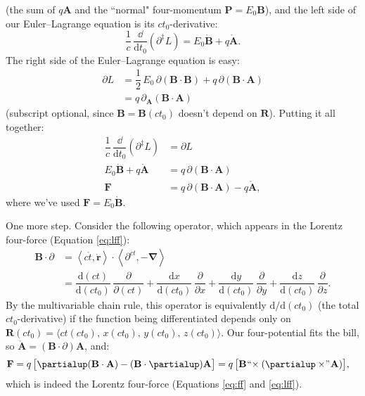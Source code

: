 \documentclass[12pt]{article}
\renewcommand{\vv}[1]{\mathbf{#1}}
\newcommand{\dd}[1]{\mathrm{d}#1}
\newcommand{\del}{\boldsymbol{\nabla}}
\begin{document}
(the sum of $q \vv A$ and the ``normal" four-momentum $\vv P = E_0 \vv B$), and the left side of our Euler--Lagrange equation is its $ct_0$-derivative:
\begin{equation*}
\dfrac{1}{c} \, \dfrac{\dd}{\dd t_0} \left( \partialup^\ddagger L \right) =  E_0 \mathring{\vv B} + q \mathring{\vv A} .
\end{equation*}
The right side of the Euler--Lagrange equation is easy:
\begin{equation*}
\begin{split}
\partialup L &= \dfrac{1}{2} \, E_0 \, \partialup (\vv B \cdot \vv B) + q \, \partialup (\vv B \cdot \vv A) \\[2pt]
&= q \, \partialup_{\vv A} (\vv B \cdot \vv A)
\end{split}
\end{equation*}
(subscript optional, since $\vv B = \vv B(ct_0)$ doesn't depend on $\vv R$). Putting it all together:
\begin{equation*}
\begin{split}
\dfrac{1}{c} \, \dfrac{\dd}{\dd t_0} \left( \partialup^\ddagger L \right) &= \partialup L \\[2pt]
E_0 \mathring{\vv B} + q \mathring{\vv A} &= q \, \partialup (\vv B \cdot \vv A) \\[3pt]
\vv F &= q \, \partialup (\vv B \cdot \vv A) - q \mathring{\vv A} ,
\end{split}
\end{equation*}
where we've used $\vv F = E_0 \mathring{\vv B}$.

One more step. Consider the following operator, which appears in the Lorentz four-force (Equation \ref{eq:lff}):
\begin{equation*}
\begin{split}
\vv B \cdot \partialup &= \left \langle c \mathring{t}, \mathring{\vv r} \right \rangle \cdot \left \langle \partial^{ct}, - \del \right \rangle \\[4pt]
&= \dfrac{\dd (ct)}{\dd (ct_0)} \, \dfrac{\partial}{\partial (ct)} + \dfrac{\dd x}{\dd (ct_0)} \, \dfrac{\partial}{\partial x} +  \dfrac{\dd y}{\dd (ct_0)} \, \dfrac{\partial}{\partial y} + \dfrac{\dd z}{\dd (ct_0)} \, \dfrac{\partial}{\partial z} .
\end{split}
\end{equation*}
By the multivariable chain rule, this operator is equivalently $\dd / \dd (ct_0)$ (the total $ct_0$-derivative) if the function being differentiated depends only on ${\vv R (ct_0) = \langle ct (ct_0), \, x (ct_0), \, y (ct_0), \, z (ct_0) \rangle}$. Our four-potential fits the bill, so $\mathring{\vv A} = (\vv B \cdot \partialup) \vv A $, and:
\begin{equation*}
\begin{split}
\vv F &= q \, \bigl[ \partialup (\vv B \cdot \vv A) - (\vv B \cdot \partialup) \vv A \bigr] = q \, \bigl[ \vv B \mkern1mu `` \mkern-4mu \times (\partialup \times \mkern-4mu " \mkern1mu \vv A) \bigr] ,
\end{split}
\end{equation*}
which is indeed the Lorentz four-force (Equations \ref{eq:ff} and \ref{eq:lff}).
\end{document}
